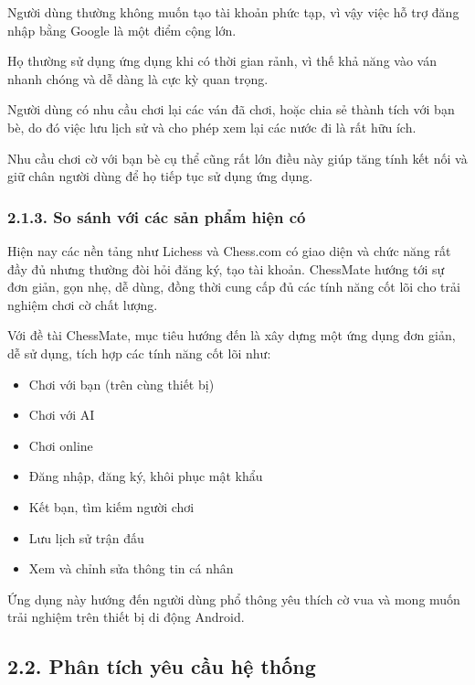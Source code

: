 \documentclass[a4paper,12pt]{article}
\begin{document}
\noindent Người dùng thường không muốn tạo tài khoản phức tạp, vì vậy việc hỗ trợ đăng nhập bằng Google là một điểm cộng lớn.

\noindent Họ thường sử dụng ứng dụng khi có thời gian rảnh, vì thế khả năng vào ván nhanh chóng và dễ dàng là cực kỳ quan trọng.

\noindent Người dùng có nhu cầu chơi lại các ván đã chơi, hoặc chia sẻ thành tích với bạn bè, do đó việc lưu lịch sử và cho phép xem lại các nước đi là rất hữu ích.

\noindent Nhu cầu chơi cờ với bạn bè cụ thể cũng rất lớn \textendash{} điều này giúp tăng tính kết nối và giữ chân người dùng để họ tiếp tục sử dụng ứng dụng.

\subsubsection*{2.1.3. So sánh với các sản phẩm hiện có}

\noindent Hiện nay các nền tảng như Lichess và Chess.com có giao diện và chức năng rất đầy đủ nhưng thường đòi hỏi đăng ký, tạo tài khoản. ChessMate hướng tới sự đơn giản, gọn nhẹ, dễ dùng, đồng thời cung cấp đủ các tính năng cốt lõi cho trải nghiệm chơi cờ chất lượng.

\bigskip %

\noindent Với đề tài ChessMate, mục tiêu hướng đến là xây dựng một ứng dụng đơn giản, dễ sử dụng, tích hợp các tính năng cốt lõi như:
\begin{itemize}[label=$\cdot$]
    \item Chơi với bạn (trên cùng thiết bị)
    \item Chơi với AI
    \item Chơi online
    \item Đăng nhập, đăng ký, khôi phục mật khẩu
    \item Kết bạn, tìm kiếm người chơi
    \item Lưu lịch sử trận đấu
    \item Xem và chỉnh sửa thông tin cá nhân

\end{itemize}
\noindent Ứng dụng này hướng đến người dùng phổ thông yêu thích cờ vua và mong muốn trải nghiệm trên thiết bị di động Android.

\subsection*{2.2. Phân tích yêu cầu hệ thống} %
\end{document}
